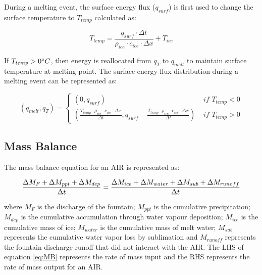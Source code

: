 \documentclass[utf8]{frontiersSCNS} %
\begin{document}
During a melting event, the surface energy flux ($q_{surf}$) is first used to change the surface temperature to
$T_{temp}$ calculated as:

\begin{equation} T_{temp} =\frac{q_{surf} \cdot \Delta t}{\rho_{ice} \cdot c_{ice} \cdot \Delta x} + T_{ice} \end{equation}

If $T_{temp} > 0 \degree C$, then energy is reallocated from $q_{T}$ to $q_{melt}$ to maintain surface temperature at
melting point. The surface energy flux distribution during a melting event can be represented as:

\begin{equation}
	(q_{melt}, q_{T}) = \left\{ \begin{array}{ll}
		(0, q_{surf})                                                                                                                                                 & \textit{ if } T_{temp} < 0 \\
		(\frac{T_{temp} \cdot \rho_{ice} \cdot c_{ice} \cdot \Delta x}{\Delta t}, q_{surf}-\frac{T_{temp} \cdot \rho_{ice} \cdot c_{ice} \cdot \Delta x}{\Delta t}  ) & \textit{ if } T_{temp} > 0
	\end{array} \right.
\end{equation}


\subsection{Mass Balance}

The mass balance equation for an AIR is represented as:

\begin{equation}
	\frac{\Delta M_{F} + \Delta M_{ppt} + \Delta M_{dep}}{\Delta t} = \frac{\Delta M_{ice} +\Delta M_{water} +
		\Delta M_{sub} + \Delta M_{runoff}}{\Delta t}  \\
	\label{eq:MB}
\end{equation}

where $M_{F}$ is the discharge of the fountain; $M_{ppt}$ is the cumulative precipitation;  $M_{dep}$ is the cumulative
accumulation through water vapour deposition; $M_{ice}$ is the cumulative mass of ice; $M_{water}$ is the cumulative
mass of melt water; $M_{sub}$ represents the cumulative water vapor loss by sublimation and $M_{runoff}$ represents the
fountain discharge runoff that did not interact with the AIR. The LHS of equation \ref{eq:MB} represents the rate of
mass input and the RHS represents the rate of mass output for an AIR.
\end{document}

